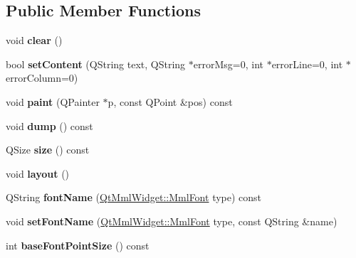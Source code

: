 \subsection*{Public Member Functions}
\begin{DoxyCompactItemize}
\item 
\mbox{\label{class_mml_document_a70588061ecbff078b4f1824c2ef9640a}} 
void {\bfseries clear} ()
\item 
\mbox{\label{class_mml_document_a78d12b1d2d7c4a7b6d5aac3a5920e094}} 
bool {\bfseries set\+Content} (Q\+String text, Q\+String $\ast$error\+Msg=0, int $\ast$error\+Line=0, int $\ast$error\+Column=0)
\item 
\mbox{\label{class_mml_document_ab522a00c9c931c9cc4eaf7042368bb0e}} 
void {\bfseries paint} (Q\+Painter $\ast$p, const Q\+Point \&pos) const
\item 
\mbox{\label{class_mml_document_a97d879be65984bb380d0f5c424da2e06}} 
void {\bfseries dump} () const
\item 
\mbox{\label{class_mml_document_a1ed6cad580f85daf58e4bc6a7b22501c}} 
Q\+Size {\bfseries size} () const
\item 
\mbox{\label{class_mml_document_ad941ee3cbf32a53570647852dcbfa455}} 
void {\bfseries layout} ()
\item 
\mbox{\label{class_mml_document_abba368653535685c346cdb5c5e6fcfad}} 
Q\+String {\bfseries font\+Name} (\mbox{\hyperlink{class_qt_mml_widget_ac3fde39f7b605557d80bded69f985d2a}{Qt\+Mml\+Widget\+::\+Mml\+Font}} type) const
\item 
\mbox{\label{class_mml_document_aaa74e44fac3437b9073e11611eeafc15}} 
void {\bfseries set\+Font\+Name} (\mbox{\hyperlink{class_qt_mml_widget_ac3fde39f7b605557d80bded69f985d2a}{Qt\+Mml\+Widget\+::\+Mml\+Font}} type, const Q\+String \&name)
\item 
\mbox{\label{class_mml_document_adccbe67d54eead10e3310c47fa47d049}} 
int {\bfseries base\+Font\+Point\+Size} () const
\item 

\end{DoxyCompactItemize}
